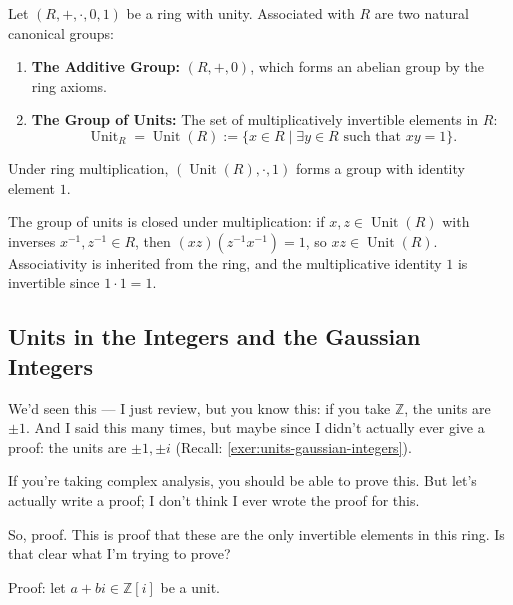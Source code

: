 \begin{content}

Let $(R, +, \cdot, 0, 1)$ be a ring with unity. Associated with $R$ are two natural canonical groups:
\begin{enumerate}[label=\textbf{(\arabic*)}]
    \item \textbf{The Additive Group:} $(R, +, 0)$, which forms an abelian group by the ring axioms.
    \item \textbf{The Group of Units:} The set of multiplicatively invertible elements in $R$:
    \begin{equation}\label{eq:unit-group-def-w3}
    \operatorname{Unit}_R = \operatorname{Unit}(R) := \{ x \in R \mid \exists y \in R \text{ such that } xy = 1 \}.
    \end{equation}
\end{enumerate}

Under ring multiplication, $(\operatorname{Unit}(R), \cdot, 1)$ forms a group with identity element $1$.

\begin{steps}
The group of units is closed under multiplication: if $x, z \in \operatorname{Unit}(R)$ with inverses $x^{-1}, z^{-1} \in R$, then $(xz)(z^{-1}x^{-1}) = 1$, so $xz \in \operatorname{Unit}(R)$. Associativity is inherited from the ring, and the multiplicative identity $1$ is invertible since $1 \cdot 1 = 1$.
\end{steps}
\end{content}

\subsection{Units in the Integers and the Gaussian Integers}

\begin{speech}[00:01:40 - 00:02:45]
We'd seen this --- I just review, but you know this: if you take $\mathbb{Z}$,  the units are $\pm 1$. And I said this many times, but maybe since I didn't actually ever give a proof:  the units are $\pm 1, \pm i$ (Recall: \cref{exer:units-gaussian-integers}).

If you're taking complex analysis, you should be able to prove this. But let's actually write a proof; I don't think I ever wrote the proof for this.

So, proof.  This is proof that these are the only invertible elements in this ring. Is that clear what I'm trying to prove?

Proof: let $a + bi \in \mathbb{Z}[i]$ be a unit. 
\end{speech}

